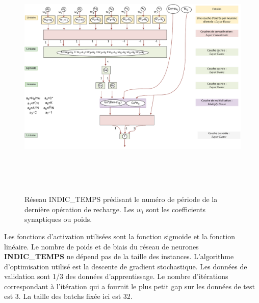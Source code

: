 \begin{figure}[H]
	\centerline{
		\includegraphics[height=12cm]{images_these/time_value_scheme.pdf}}
	\caption[Réseau INDIC\_TEMPS prédisant le numéro de période de la dernière recharge]{Réseau  INDIC\_TEMPS prédisant le numéro de période de la dernière opération de recharge. Les $w_i$ sont les coefficients synaptiques ou poids.}
	\label{time_value_scheme}
\end{figure}


 Les fonctions d'activation utilisées sont la fonction sigmoïde et la fonction linéaire.
Le nombre de poids et de biais du réseau de neurones \textbf{INDIC\_TEMPS} ne dépend pas de la taille des instances. L'algorithme d'optimisation utilisé est la descente de gradient stochastique. Les données de validation sont 1/3 des données d'apprentissage. Le nombre d'itérations correspondant à l'itération qui a fournit le plus petit gap sur les données de test est 3. La taille des batchs fixée ici est 32.  %

